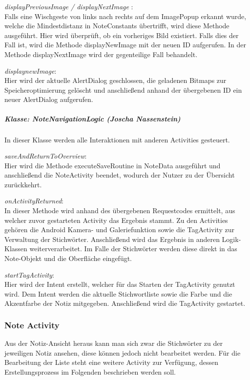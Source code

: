 \textit{displayPreviousImage / displayNextImage }:\\
Falls eine Wischgeste von links nach rechts auf dem ImagePopup erkannt wurde, welche die Mindestdistanz in NoteConstants übertrifft, wird diese Methode ausgeführt. Hier wird überprüft, ob ein vorheriges Bild existiert. Falls dies der Fall ist, wird die Methode displayNewImage mit der neuen ID aufgerufen. In der Methode displayNextImage wird der gegenteilige Fall behandelt.

\textit{displaynewImage}:\\
Hier wird der aktuelle AlertDialog geschlossen, die geladenen Bitmaps zur Speicheroptimierung gelöscht und anschließend anhand der übergebenen ID ein neuer AlertDialog aufgerufen.

\subparagraph{Klasse: NoteNavigationLogic (Joscha Nassenstein)}
In dieser Klasse werden alle Interaktionen mit anderen Activities gesteuert.

\textit{saveAndReturnToOverview}:\\
Hier wird die Methode executeSaveRoutine in NoteData ausgeführt und anschließend die NoteActivity beendet, wodurch der Nutzer zu der Übersicht zurückkehrt.

\textit{onActivityReturned}:\\
In dieser Methode wird anhand des übergebenen Requestcodes ermittelt, aus welcher zuvor gestarteten Activity das Ergebnis stammt. Zu den Activities gehören die Android Kamera- und Galeriefunktion sowie die TagActivity zur Verwaltung der Stichwörter. Anschließend wird das Ergebnis in anderen Logik-Klassen weiterverarbeitet. Im Falle der Stichwörter werden diese direkt in das Note-Objekt und die Oberfläche eingefügt.

\textit{startTagActivity}:\\
Hier wird der Intent erstellt, welcher für das Starten der TagActivity genutzt wird. Dem Intent werden die aktuelle Stichwortliste sowie die Farbe und die Akzentfarbe der Notiz mitgegeben. Anschließend wird die TagActivity gestartet.

\subsubsection{Note Activity}
Aus der Notiz-Ansicht heraus kann man sich zwar die Stichwörter zu der jeweiligen Notiz ansehen, diese können jedoch nicht bearbeitet werden. Für die Bearbeitung der Liste steht eine weitere Activity zur Verfügung, dessen Erstellungsprozess im Folgenden beschrieben werden soll.

